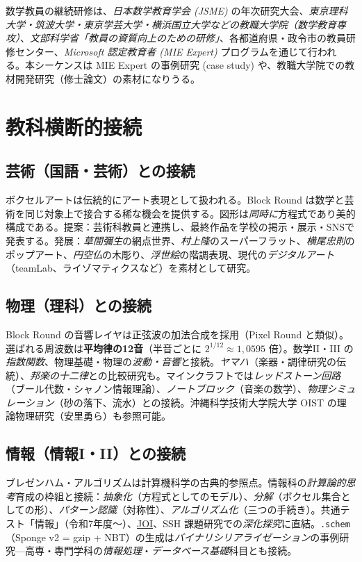 \documentclass[12pt,a4paper]{scrartcl}
\newcommand{\acc}[1]{\textcolor{accent}{\textbf{#1}}}
\begin{document}
数学教員の継続研修は、\emph{日本数学教育学会 (JSME)} の年次研究大会、\emph{東京理科大学・筑波大学・東京学芸大学・横浜国立大学などの教職大学院（数学教育専攻）}、\emph{文部科学省「教員の資質向上のための研修」}、各都道府県・政令市の教員研修センター、\emph{Microsoft 認定教育者 (MIE Expert)} プログラムを通じて行われる。本シーケンスは MIE Expert の事例研究 (case study) や、教職大学院での教材開発研究（修士論文）の素材になりうる。

\section{教科横断的接続}\label{sec:interdisc}

\subsection{芸術（国語・芸術）との接続}
ボクセルアートは伝統的にアート表現として扱われる。Block Round は数学と芸術を同じ対象上で接合する稀な機会を提供する。図形は\emph{同時に}方程式であり美的構成である。提案：芸術科教員と連携し、最終作品を学校の掲示・展示・SNSで発表する。発展：\emph{草間彌生}の網点世界、\emph{村上隆}のスーパーフラット、\emph{横尾忠則}のポップアート、\emph{円空仏}の木彫り、\emph{浮世絵}の階調表現、現代の\emph{デジタルアート}（teamLab、ライゾマティクスなど）を素材として研究。

\subsection{物理（理科）との接続}
Block Round の音響レイヤは正弦波の加法合成を採用（Pixel Round と類似）。選ばれる周波数は\acc{平均律の12音}（半音ごとに $2^{1/12} \approx 1{,}0595$ 倍）。数学II・III の\emph{指数関数}、物理基礎・物理の\emph{波動・音響}と接続。\emph{ヤマハ}（楽器・調律研究の伝統）、\emph{邦楽の十二律}との比較研究も。マインクラフトでは\emph{レッドストーン回路}（ブール代数・シャノン情報理論）、\emph{ノートブロック}（音楽の数学）、\emph{物理シミュレーション}（砂の落下、流水）との接続。沖縄科学技術大学院大学 OIST の理論物理研究（安里勇ら）も参照可能。

\subsection{情報（情報I・II）との接続}
ブレゼンハム・アルゴリズムは計算機科学の古典的参照点。情報科の\emph{計算論的思考}育成の枠組と接続：\emph{抽象化}（方程式としてのモデル）、\emph{分解}（ボクセル集合としての形）、\emph{パターン認識}（対称性）、\emph{アルゴリズム化}（三つの手続き）。共通テスト「情報」（令和7年度〜）、\hyperref[sec:jmo]{JOI}、SSH 課題研究での\emph{深化探究}に直結。\texttt{.schem}（Sponge v2 = gzip + NBT）の生成は\emph{バイナリシリアライゼーション}の事例研究---高専・専門学科の\emph{情報処理}・\emph{データベース基礎}科目とも接続。
\end{document}
